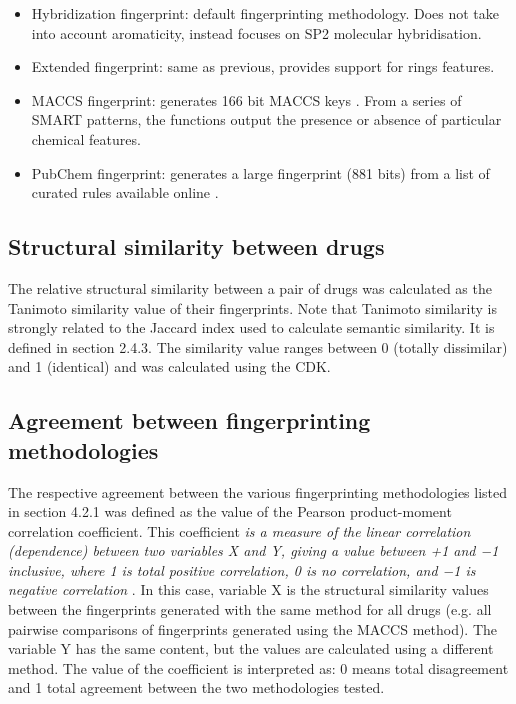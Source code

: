 \begin{itemize}
  \item Hybridization fingerprint: default fingerprinting methodology. Does not take into account aromaticity, instead focuses on SP2 molecular hybridisation.
  \item Extended fingerprint: same as previous, provides support for rings features.
  \item MACCS fingerprint: generates 166 bit MACCS keys \citep{fpdalke}. From a series of SMART patterns, the functions output the presence or absence of particular chemical features.
  \item PubChem fingerprint: generates a large fingerprint (881 bits) from a list of curated rules available online \citep{pubchemfp}.
\end{itemize}

\subsection{Structural similarity between drugs}
The relative structural similarity between a pair of drugs was calculated as the Tanimoto similarity value \citep{tanimoto1958elementary} of their fingerprints. Note that Tanimoto similarity is strongly related to the Jaccard index used to calculate semantic similarity. It is defined in section 2.4.3. The similarity value ranges between 0 (totally dissimilar) and 1 (identical) and was calculated using the CDK.

\subsection{Agreement between fingerprinting methodologies}
The respective agreement between the various fingerprinting methodologies listed in section 4.2.1 was defined as the value of the Pearson product-moment correlation coefficient. This coefficient \emph{is a measure of the linear correlation (dependence) between two variables X and Y, giving a value between +1 and −1 inclusive, where 1 is total positive correlation, 0 is no correlation, and −1 is negative correlation} \citep{hane1993pearson}. In this case, variable X is the structural similarity values between the fingerprints generated with the same method for all drugs (e.g. all pairwise comparisons of fingerprints generated using the MACCS method). The variable Y has the same content, but the values are calculated using a different method. The value of the coefficient is interpreted as: 0 means total disagreement and 1 total agreement between the two methodologies tested.

